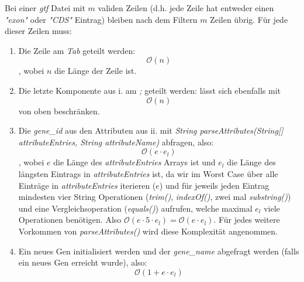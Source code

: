 \documentclass[12pt]{article}
\begin{document}
\begin{enumerate}
        Bei einer \textit{gtf} Datei mit $m$ validen Zeilen (d.h. jede Zeile hat entweder einen \textit{"exon"} oder \textit{"CDS"} Eintrag) bleiben
        nach dem Filtern $m$ Zeilen übrig.
        Für jede dieser Zeilen muss:
        \begin{enumerate}
            \item Die Zeile am \textit{Tab} geteilt werden: 
                \begin{equation}
                    \mathcal{O}(n)
                \end{equation}
                , wobei $n$ die Länge der Zeile ist.
            \item Die letzte Komponente aus i. am \textit{;} geteilt werden: lässt sich ebenfalls mit 
                \begin{equation}
                    \mathcal{O}(n)
                \end{equation}
                von oben beschränken.
            \item Die \textit{gene\_id} aus den Attributen aus ii. mit \textit{String parseAttributes(String[] attributeEntries, String attributeName)}
                abfragen, also:
                \begin{equation}
                   \mathcal{O}(e \cdot e_{l})
                \end{equation}
                , wobei $e$ die Länge des \textit{attributeEntries} Arrays ist und
                $e_{l}$ die Länge des längsten Eintrags in \textit{attributeEntries} ist, da wir im Worst Case
                über alle Einträge in \textit{attributeEntries} iterieren ($e$) und für jeweils jeden Eintrag
                mindesten vier String Operationen (\textit{trim()}, \textit{indexOf()}, zwei mal \textit{substring()})
                und eine Vergleichsoperation (\textit{equals()}) aufrufen, welche maximal $e_{l}$ viele 
                Operationen benötigen. Also $\mathcal{O}(e \cdot 5 \cdot e_{l}) = \mathcal{O}(e \cdot e_{l})$.
                Für jedes weitere Vorkommen von \textit{parseAttributes()} wird diese Komplexität angenommen.
            \item Ein neues Gen initialisiert werden und der \textit{gene\_name} abgefragt werden (falls ein neues Gen erreicht wurde), also: 
                \begin{equation}
                    \mathcal{O}(1 + e \cdot e_{l})   
                \end{equation}

\end{enumerate}
\end{enumerate}
\end{document}

